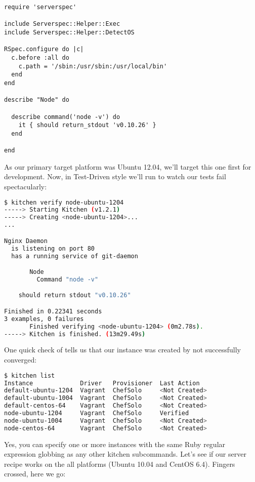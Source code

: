 \begin{lstlisting}[label=lst:testing-test-kitchen39]
require 'serverspec'

include Serverspec::Helper::Exec
include Serverspec::Helper::DetectOS

RSpec.configure do |c|
  c.before :all do
    c.path = '/sbin:/usr/sbin:/usr/local/bin'
  end
end

describe "Node" do

  describe command('node -v') do
    it { should return_stdout 'v0.10.26' }
  end

end
\end{lstlisting}

As our primary target platform was Ubuntu 12.04, we'll target this one first for development. Now, in Test-Driven style we'll run  to watch our tests fail spectacularly:

\begin{lstlisting}[language=Bash,label=lst:testing-test-kitchen40]
$ kitchen verify node-ubuntu-1204
-----> Starting Kitchen (v1.2.1)
-----> Creating <node-ubuntu-1204>...
...

Nginx Daemon
  is listening on port 80
  has a running service of git-daemon

       Node
         Command "node -v"

    should return stdout "v0.10.26"

Finished in 0.22341 seconds
3 examples, 0 failures
       Finished verifying <node-ubuntu-1204> (0m2.78s).
-----> Kitchen is finished. (13m29.49s)

\end{lstlisting}

One quick check of  tells us that our instance was created by not successfully converged:

\begin{lstlisting}[language=Bash,label=lst:testing-test-kitchen41]
$ kitchen list
Instance             Driver   Provisioner  Last Action
default-ubuntu-1204  Vagrant  ChefSolo     <Not Created>
default-ubuntu-1004  Vagrant  ChefSolo     <Not Created>
default-centos-64    Vagrant  ChefSolo     <Not Created>
node-ubuntu-1204     Vagrant  ChefSolo     Verified
node-ubuntu-1004     Vagrant  ChefSolo     <Not Created>
node-centos-64       Vagrant  ChefSolo     <Not Created>
\end{lstlisting}

Yes, you can specify one or more instances with the same Ruby regular expression globbing as any other kitchen subcommands. Let's see if our server recipe works on the all platforms (Ubuntu 10.04 and CentOS 6.4). Fingers crossed, here we go:

